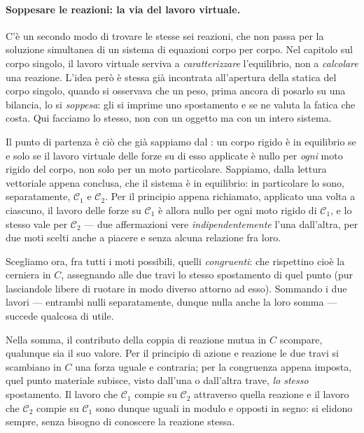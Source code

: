 \paragraph{Soppesare le reazioni: la via del lavoro virtuale.}
C'è un secondo modo di trovare le stesse sei reazioni, che non passa per
la soluzione simultanea di un sistema di equazioni corpo per corpo. Nel capitolo sul corpo singolo, il lavoro virtuale
serviva a \emph{caratterizzare} l'equilibrio, non a \emph{calcolare} una
reazione. L'idea però è stessa già incontrata all'apertura della statica del
corpo singolo, quando si osservava che un peso, prima ancora di posarlo
su una bilancia, lo si \emph{soppesa}: gli si imprime uno spostamento e
se ne valuta la fatica che costa. Qui facciamo lo stesso, non con un
oggetto ma con un intero sistema.

Il punto di partenza è ciò che già sappiamo dal
: un corpo rigido è in equilibrio se e solo se il
lavoro virtuale delle forze su di esso applicate è nullo per \emph{ogni}
moto rigido del corpo, non solo per un moto particolare. Sappiamo, dalla
lettura vettoriale appena conclusa, che il sistema è in equilibrio: in
particolare lo sono, separatamente, $\mathcal{C}_1$ e $\mathcal{C}_2$.
Per il principio appena richiamato, applicato una volta a ciascuno, il
lavoro delle forze su $\mathcal{C}_1$ è allora nullo per ogni moto rigido
di $\mathcal{C}_1$, e lo stesso vale per $\mathcal{C}_2$ --- due
affermazioni vere \emph{indipendentemente} l'una dall'altra, per due moti
scelti anche a piacere e senza alcuna relazione fra loro.

Scegliamo ora, fra tutti i moti possibili, quelli \emph{congruenti}: che
rispettino cioè la cerniera in $C$, assegnando alle due travi lo stesso
spostamento di quel punto (pur lasciandole libere di ruotare in modo
diverso attorno ad esso). Sommando i due lavori --- entrambi nulli
separatamente, dunque nulla anche la loro somma --- succede qualcosa di
utile.

\begin{oss}
	Nella somma, il contributo della coppia di reazione mutua in $C$
	scompare, qualunque sia il suo valore. Per il principio di azione e
	reazione le due travi si scambiano in $C$ una forza uguale e
	contraria; per la congruenza appena imposta, quel punto materiale
	subisce, visto dall'una o dall'altra trave, \emph{lo stesso}
	spostamento. Il lavoro che $\mathcal{C}_1$ compie su $\mathcal{C}_2$
	attraverso quella reazione e il lavoro che $\mathcal{C}_2$ compie su
$\mathcal{C}_1$ sono dunque uguali in modulo e opposti in segno: si
elidono sempre, senza bisogno di conoscere la reazione stessa. 
\end{oss}

